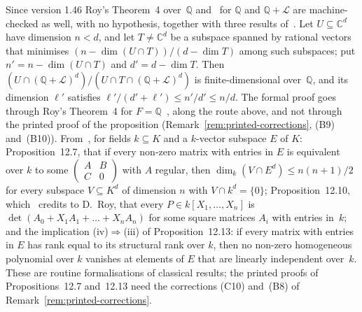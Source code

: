\documentclass[11pt,a4paper]{article}
\theoremstyle{plain}
\theoremstyle{definition}
\newcommand{\C}{\mathbb{C}}
\newcommand{\Q}{\mathbb{Q}}
\newcommand{\Logs}{\mathcal{L}}
\begin{document}
Since version 1.46 Roy's Theorem~4 over~$\Q$ and~\cite[Proposition~11.19]{waldschmidt-book} for $\Q$ and $\Q+\Logs$
are machine-checked as well, with no hypothesis, together with three results of~\cite[\S12.1]{waldschmidt-book}. Let
$U\subseteq\C^{d}$ have dimension $n<d$, and let $T\neq\C^{d}$ be a subspace spanned by rational vectors that
minimises $(n-\dim(U\cap T))/(d-\dim T)$ among such subspaces; put $n'=n-\dim(U\cap T)$ and $d'=d-\dim T$. Then
$(U\cap(\Q+\Logs)^{d})/(U\cap T\cap(\Q+\Logs)^{d})$ is finite-dimensional over~$\Q$, and its dimension $\ell'$
satisfies $\ell'/(d'+\ell')\leq n'/d'\leq n/d$. The formal proof goes through Roy's Theorem~4 for
$F=\Q$~\cite[Remark~(i), p.~37]{roy-1992}, along the route above, and not through the printed proof of the
proposition (Remark~\ref{rem:printed-corrections}, (B9) and~(B10)). From~\cite[\S12.1]{waldschmidt-book}, for fields
$k\subseteq K$ and a $k$-vector subspace $E$ of $K$: Proposition~12.7, that if every non-zero matrix with entries in
$E$ is equivalent over $k$ to some $\left(\begin{smallmatrix}A&B\\C&0\end{smallmatrix}\right)$ with $A$ regular,
then $\dim_{k}(V\cap E^{d})\leq n(n+1)/2$ for every subspace $V\subseteq K^{d}$ of dimension $n$ with
$V\cap k^{d}=\{0\}$; Proposition~12.10, which~\cite[p.~428]{waldschmidt-book} credits to D.~Roy, that every
$P\in k[X_{1},\dots,X_{n}]$ is $\det(A_{0}+X_{1}A_{1}+\dots+X_{n}A_{n})$ for some square matrices $A_{i}$ with
entries in~$k$; and the implication (iv)$\Rightarrow$(iii) of Proposition~12.13: if every matrix with entries in
$E$ has rank equal to its structural rank over $k$, then no non-zero homogeneous polynomial over $k$ vanishes at
elements of $E$ that are linearly independent over~$k$. These are routine formalisations of classical results; the
printed proofs of Propositions~12.7 and~12.13 need the corrections (C10) and~(B8) of
Remark~\ref{rem:printed-corrections}.
\end{document}
